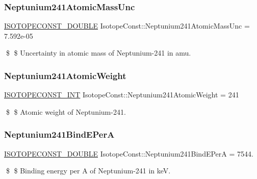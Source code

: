 \subsubsection{\texorpdfstring{Neptunium241\+Atomic\+Mass\+Unc}{Neptunium241AtomicMassUnc}}
{\footnotesize\ttfamily \mbox{\hyperlink{group___isotope_const-_macros_ga8f45a7272ce02c0b4c65c44636ed719a}{I\+S\+O\+T\+O\+P\+E\+C\+O\+N\+S\+T\+\_\+\+D\+O\+U\+B\+LE}} Isotope\+Const\+::\+Neptunium241\+Atomic\+Mass\+Unc = 7.\+592e-\/05}

\$ \$ Uncertainty in atomic mass of Neptunium-\/241 in amu. \mbox{\label{group___isotope_const-_neptunium-_np241_ga1d5a46d0ff122f048f05fd56f83fa8c2}} 
\subsubsection{\texorpdfstring{Neptunium241\+Atomic\+Weight}{Neptunium241AtomicWeight}}
{\footnotesize\ttfamily \mbox{\hyperlink{group___isotope_const-_macros_ga5f18360b3e99483a35c32d789e62621c}{I\+S\+O\+T\+O\+P\+E\+C\+O\+N\+S\+T\+\_\+\+I\+NT}} Isotope\+Const\+::\+Neptunium241\+Atomic\+Weight = 241}

\$ \$ Atomic weight of Neptunium-\/241. \mbox{\label{group___isotope_const-_neptunium-_np241_ga7b01243329c0486933d14d9d062280a7}} 
\subsubsection{\texorpdfstring{Neptunium241\+Bind\+E\+PerA}{Neptunium241BindEPerA}}
{\footnotesize\ttfamily \mbox{\hyperlink{group___isotope_const-_macros_ga8f45a7272ce02c0b4c65c44636ed719a}{I\+S\+O\+T\+O\+P\+E\+C\+O\+N\+S\+T\+\_\+\+D\+O\+U\+B\+LE}} Isotope\+Const\+::\+Neptunium241\+Bind\+E\+PerA = 7544.}

\$ \$ Binding energy per A of Neptunium-\/241 in keV. \mbox{\label{group___isotope_const-_neptunium-_np241_ga43c806f473205780c7476192085a0c6c}} 
